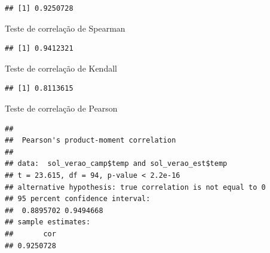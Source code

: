 \documentclass[
]{book}
\newenvironment{Shaded}{\begin{snugshade}}{\end{snugshade}}
\newcommand{\DataTypeTok}[1]{\textcolor[rgb]{0.13,0.29,0.53}{#1}}
\newcommand{\KeywordTok}[1]{\textcolor[rgb]{0.13,0.29,0.53}{\textbf{#1}}}
\newcommand{\NormalTok}[1]{#1}
\newcommand{\OperatorTok}[1]{\textcolor[rgb]{0.81,0.36,0.00}{\textbf{#1}}}
\newcommand{\StringTok}[1]{\textcolor[rgb]{0.31,0.60,0.02}{#1}}
\begin{document}
\begin{verbatim}
## [1] 0.9250728
\end{verbatim}

Teste de correlação de Spearman

\begin{Shaded}
\end{Shaded}

\begin{verbatim}
## [1] 0.9412321
\end{verbatim}

Teste de correlação de Kendall

\begin{Shaded}
\end{Shaded}

\begin{verbatim}
## [1] 0.8113615
\end{verbatim}

Teste de correlação de Pearson

\begin{Shaded}
\end{Shaded}

\begin{verbatim}
## 
##  Pearson's product-moment correlation
## 
## data:  sol_verao_camp$temp and sol_verao_est$temp
## t = 23.615, df = 94, p-value < 2.2e-16
## alternative hypothesis: true correlation is not equal to 0
## 95 percent confidence interval:
##  0.8895702 0.9494668
## sample estimates:
##       cor 
## 0.9250728
\end{verbatim}

\begin{Shaded}
\end{Shaded}
\end{document}
